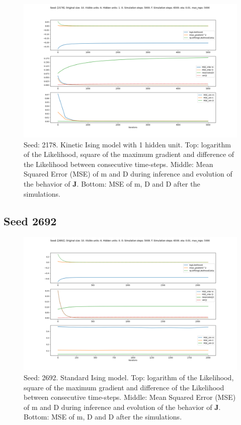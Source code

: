 \documentclass{article}
\def\*#1{\mathbf{#1}}
\begin{document}
\begin{figure}[!htb]
    \centering
    \includegraphics[width=0.8\linewidth]{images/sqrt_size/[2178]_10_6_1_5000_6500_eta001_5000_100.png}
\caption{Seed: 2178. Kinetic Ising model with 1 hidden unit. Top: logarithm of the Likelihood, square of the maximum gradient and difference of the Likelihood between consecutive time-steps. Middle: Mean Squared Error (MSE) of m and D during inference and evolution of the behavior of $\*J$. Bottom: MSE of m, D and D after the simulations.}
\end{figure}



\newpage
\subsection{Seed 2692}

\begin{figure}[!htb]
    \centering
    \includegraphics[width=0.8\linewidth]{images/sqrt_size/[2692]_10_6_0_5000_6500_eta001_5000_100.png}
\caption{Seed: 2692. Standard Ising model. Top: logarithm of the Likelihood, square of the maximum gradient and difference of the Likelihood between consecutive time-steps. Middle: Mean Squared Error (MSE) of m and D during inference and evolution of the behavior of $\*J$. Bottom: MSE of m, D and D after the simulations.}
\end{figure}
\end{document}
